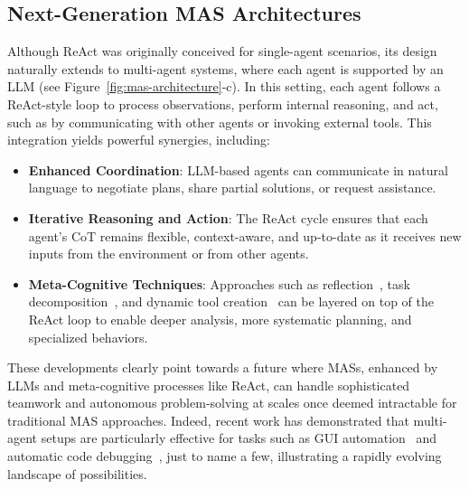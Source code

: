 \subsection{Next-Generation MAS Architectures}
Although ReAct was originally conceived for single-agent scenarios, its design naturally extends to multi-agent systems, where each agent is supported by an LLM (see Figure~\ref{fig:mas-architecture}-c). In this setting, each agent follows a ReAct-style loop to process observations, perform internal reasoning, and act, such as by communicating with other agents or invoking external tools. This integration yields powerful synergies, including:

\begin{itemize}[noitemsep]
\item {\bf Enhanced Coordination}: LLM-based agents can communicate in natural language to negotiate plans, share partial solutions, or request assistance.
\item {\bf Iterative Reasoning and Action}: The ReAct cycle ensures that each agent's CoT remains flexible, context-aware, and up-to-date as it receives new inputs from the environment or from other agents.
\item {\bf Meta-Cognitive Techniques}: Approaches such as reflection~\cite{yao2022react}, task decomposition~\cite{wei2022chain,yao2024tree}, and dynamic tool creation~\cite{qin2023toolllm} can be layered on top of the ReAct loop to enable deeper analysis, more systematic planning, and specialized behaviors.
\end{itemize}

These developments clearly point towards a future where MASs, enhanced by LLMs and meta-cognitive processes like ReAct, can handle sophisticated teamwork and autonomous problem-solving at scales once deemed intractable for traditional MAS approaches. Indeed, recent work has demonstrated that multi-agent setups are particularly effective for tasks such as GUI automation~\cite{agashe2024agent,tan2024cradle,zhang2024ufo} and automatic code debugging~\cite{sami2024aivril,sami2024eda,zhao2024mage}, just to name a few, illustrating a rapidly evolving landscape of possibilities.

